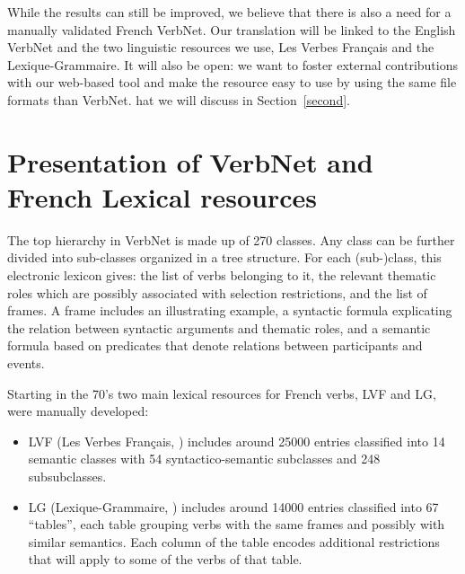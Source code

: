While the results can still be improved, we believe that there is also a need
for a manually validated French VerbNet.  Our translation will be linked to the
English VerbNet and the two linguistic resources we use, Les Verbes Français
and the Lexique-Grammaire. It will also be open: we want to foster external
contributions with our web-based tool and make the resource easy to use by
using the same file formats than VerbNet.  hat we will discuss in
Section~\ref{second}.

\section{Presentation of VerbNet and French Lexical resources}\label{french}

The top hierarchy in VerbNet is made up of 270 classes. Any class can be
further divided into sub-classes organized in a tree structure. For each
(sub-)class, this electronic lexicon gives:  the list of verbs belonging to it,
the relevant thematic roles which are possibly associated with selection
restrictions, and the list of frames. A frame includes an illustrating example,
a syntactic formula explicating the relation between syntactic arguments and
thematic roles, and a semantic formula  based on predicates that denote
relations between participants and events.

Starting in the 70's two main lexical resources for French verbs, LVF and LG,
were manually developed:


\begin{itemize}

    \item LVF (Les Verbes Français, \cite{dubois1997verbes}) includes around
    25000 entries classified into 14 semantic classes with 54 syntactico-semantic
    subclasses and 248 subsubclasses.

    \item LG (Lexique-Grammaire, \cite{gross1975methodes,boons1976structure})
    includes around 14000 entries classified into 67 ``tables'', each table
    grouping verbs with the same frames and possibly with similar semantics. Each
    column of the table encodes additional restrictions that will apply to some of
    the verbs of that table.


\end{itemize}

